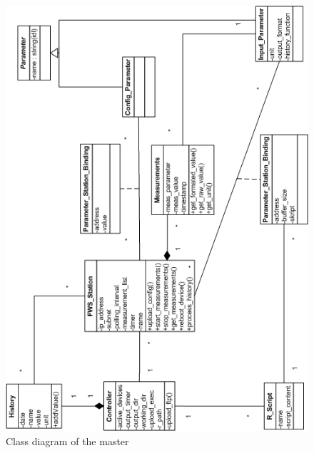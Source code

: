 \begin{figure}[ht]
    \centering
    \includegraphics[width=0.9\linewidth]{master/class.png}
    \caption{Class diagram of the master}
    \label{fig:class_master}
\end{figure}



